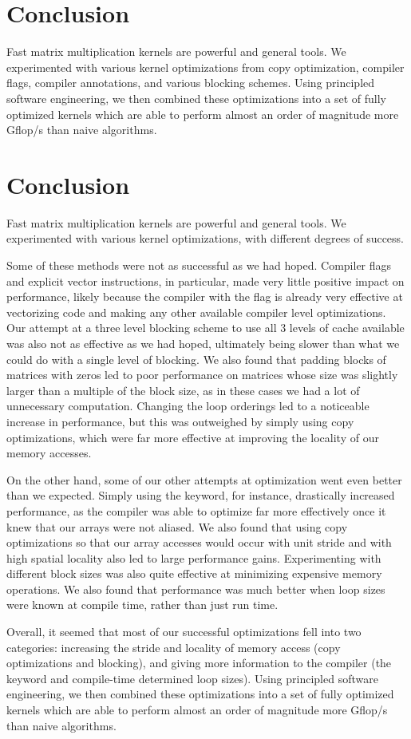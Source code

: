 \section{Conclusion}\label{sec:conc}
Fast matrix multiplication kernels are powerful and general tools. We
experimented with various kernel optimizations from copy optimization, compiler
flags, compiler annotations, and various blocking schemes. Using principled
software engineering, we then combined these optimizations into a set of fully
optimized kernels which are able to perform almost an order of magnitude more
Gflop/s than naive algorithms.

\section{Conclusion}\label{sec:conc}

Fast matrix multiplication kernels are powerful and general tools. We
experimented with various kernel optimizations, with different degrees of
success.

Some of these methods were not as successful as we had hoped.  Compiler flags
and explicit vector instructions, in particular, made very little positive
impact on performance, likely because the  compiler with the 
flag is already very effective at vectorizing code and making any other
available compiler level optimizations.  Our attempt at a three level blocking
scheme to use all 3 levels of cache available was also not as effective as we
had hoped, ultimately being slower than what we could do with a single level of
blocking.  We also found that padding blocks of matrices with zeros led to poor
performance on matrices whose size was slightly larger than a multiple of the
block size, as in these cases we had a lot of unnecessary computation.
Changing the loop orderings led to a noticeable increase in performance, but
this was outweighed by simply using copy optimizations, which were far more
effective at improving the locality of our memory accesses.

On the other hand, some of our other attempts at optimization went even better
than we expected.  Simply using the  keyword, for instance,
drastically increased performance, as the compiler was able to optimize far
more effectively once it knew that our arrays were not aliased.  We also found
that using copy optimizations so that our array accesses would occur with unit
stride and with high spatial locality also led to large performance gains.
Experimenting with different block sizes was also quite effective at minimizing
expensive memory operations.  We also found that performance was much better
when loop sizes were known at compile time, rather than just run time.

Overall, it seemed that most of our successful optimizations fell into two
categories: increasing the stride and locality of memory access (copy
optimizations and blocking), and giving more information to the compiler (the
 keyword and compile-time determined loop sizes). Using
principled software engineering, we then combined these optimizations into a
set of fully optimized kernels which are able to perform almost an order of
magnitude more Gflop/s than naive algorithms.
